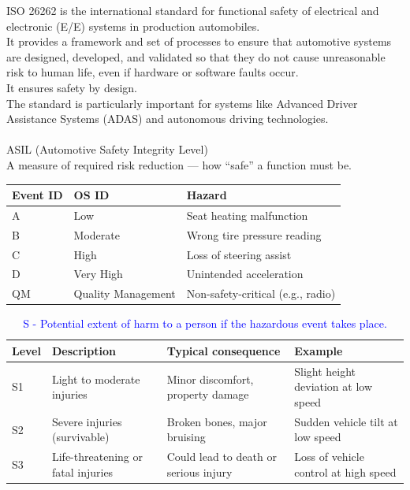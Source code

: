 \begin{solutionblock}
    ISO 26262 is the international standard for functional safety of electrical and electronic (E/E) systems in production automobiles. \\
    It provides a framework and set of processes to ensure that automotive systems are designed, developed, and validated so that they do not cause unreasonable risk to human life, even if hardware or software faults occur.\\
    It ensures safety by design. \\
    The standard is particularly important for systems like Advanced Driver Assistance Systems (ADAS) and autonomous driving technologies. \\
    \\
    ASIL (Automotive Safety Integrity Level) \\
    A measure of required risk reduction — how “safe” a function must be.\\
    \begin{table}[ht]
        \centering
        \begin{tabular}{ | m{5em} | m{4cm}| m{6cm} | }
            \hline
            Event ID & OS ID & Hazard \\
            \hline \hline
            A & Low & Seat heating malfunction\\
            B & Moderate & Wrong tire pressure reading\\
            C & High & Loss of steering assist\\
            D & Very High & Unintended acceleration\\
            QM & Quality Management & Non-safety-critical (e.g., radio)\\
            \hline
        \end{tabular}
    \end{table}

    \begin{table}[ht]
        \centering
        \begin{tabular}{ | m{5em} | m{4cm}| m{5cm} | m{5cm} |}
            \hline
            Level & Description & Typical consequence & Example \\
            \hline \hline
            S1 & Light to moderate injuries & Minor discomfort, property damage & Slight height deviation at low speed\\
            S2 & Severe injuries (survivable) & Broken bones, major bruising & Sudden vehicle tilt at low speed\\
            S3 & Life-threatening or fatal injuries & Could lead to death or serious injury & Loss of vehicle control at high speed\\
            \hline
        \end{tabular}
        \caption{\textcolor{blue}{ S - Potential extent of harm to a person if the hazardous event takes place.}}


\end{table}
\end{solutionblock}

